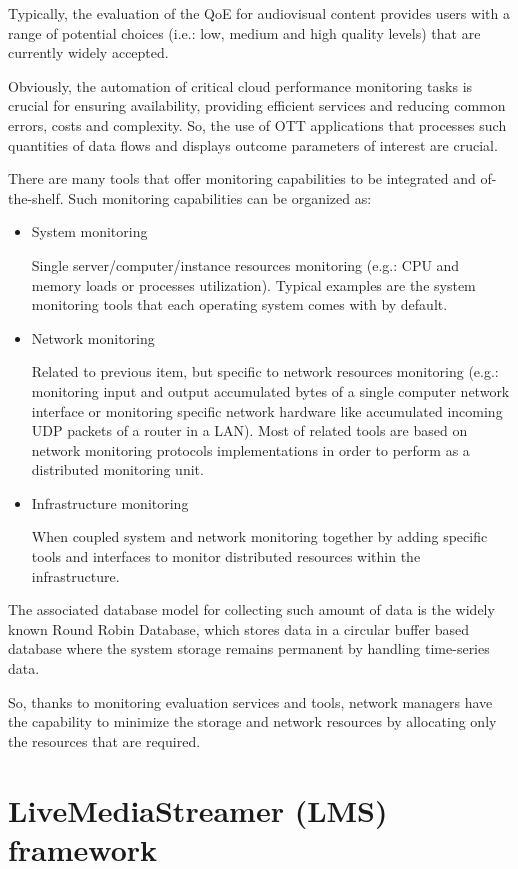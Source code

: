 Typically, the evaluation of the QoE for audiovisual content provides users with a range of potential choices (i.e.: low, medium and high quality levels) that are currently widely accepted.

Obviously, the automation of critical cloud performance monitoring tasks is crucial for ensuring availability, providing efficient services and reducing common errors, costs and complexity. So, the use of OTT applications that processes such quantities of data flows and displays outcome parameters of interest are crucial. 

There are many tools that offer monitoring capabilities to be integrated and of-the-shelf. Such monitoring capabilities can be organized as:

\begin{itemize}
\item System monitoring \hfill

Single server/computer/instance resources monitoring (e.g.: CPU and memory loads or processes utilization). Typical examples are the system monitoring tools that each operating system comes with by default.
\item Network monitoring \hfill

Related to previous item, but specific to network resources monitoring (e.g.: monitoring input and output accumulated bytes of a single computer network interface or monitoring specific network hardware like accumulated incoming UDP packets of a router in a LAN). Most of related tools are based on network monitoring protocols implementations in order to perform as a distributed monitoring unit.
\item Infrastructure monitoring \hfill

When coupled system and network monitoring together by adding specific tools and interfaces to monitor distributed resources within the infrastructure.
\end{itemize}

The associated database model for collecting such amount of data is the widely known Round Robin Database, which stores data in a circular buffer based database where the system storage remains permanent by handling time-series data. 

So, thanks to monitoring evaluation services and tools, network managers have the capability to minimize the storage and network resources by allocating only the resources that are required.

\section{LiveMediaStreamer (LMS) framework}\label{SOA:LMS}

